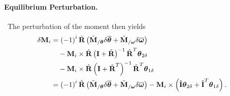 \documentclass[10pt,dvips,fleqn,subeqn]{report}
\newcommand{\T}[1]{\bm{\mathbf{#1}}}
\begin{document}
\paragraph{Equilibrium Perturbation.} \
The perturbation of the moment then yields
\begin{align}
	\delta\T{M}_i
	&= \plbr{-1}^i \hat{\T{R}} \plbr{
		\tilde{\T{M}}_{/\T{\theta}} \delta\overline{\T{\theta}}
		+ \tilde{\T{M}}_{/\T{\omega}} \delta\overline{\T{\omega}}
	} \nonumber \\
	& \mbox{\hspace{10pt}} - \T{M}_i \times \hat{\T{R}}
		\plbr{\T{I} + \tilde{\T{R}}}^{-1} \hat{\T{R}}^T \T{\theta}_{2\delta}
	\nonumber \\
	& \mbox{\hspace{10pt}} - \T{M}_i \times \hat{\T{R}} 
		\plbr{\T{I} + \tilde{\T{R}}^T}^{-1} \hat{\T{R}}^T \T{\theta}_{1\delta} \nonumber \\
	&= \plbr{-1}^i \hat{\T{R}} \plbr{
		\tilde{\T{M}}_{/\T{\theta}} \delta\overline{\T{\theta}}
		+ \tilde{\T{M}}_{/\T{\omega}} \delta\overline{\T{\omega}}
	} - \T{M}_i \times \plbr{
		\hat{\T{I}} \T{\theta}_{2\delta}
		+ \hat{\T{I}}^T \T{\theta}_{1\delta}
	} .
\end{align}
\end{document}
